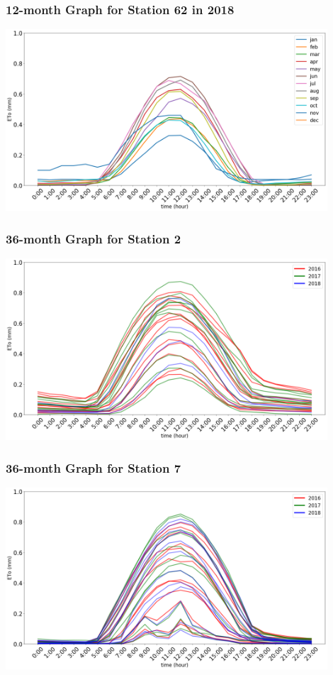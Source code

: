 \begin{frame}
\frametitle{12-month Graph for Station 62 in 2018}
\centering
\includegraphics[width=0.9\textwidth]{images/62-2018.png}
\end{frame}

\begin{frame}
\frametitle{36-month Graph for Station 2}
\centering
\includegraphics[width=0.9\textwidth]{images/234multi.png}
\end{frame}



\begin{frame}
\frametitle{36-month Graph for Station 7}
\centering
\includegraphics[width=0.9\textwidth]{images/7multi.png}
\end{frame}


